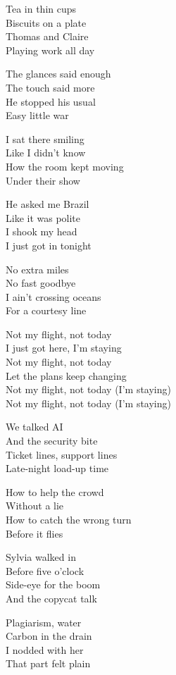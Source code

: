 \begin{lyrics}
Tea in thin cups\\
Biscuits on a plate\\
Thomas and Claire\\
Playing work all day

The glances said enough\\
The touch said more\\
He stopped his usual\\
Easy little war

I sat there smiling\\
Like I didn't know\\
How the room kept moving\\
Under their show

He asked me Brazil\\
Like it was polite\\
I shook my head\\
I just got in tonight

No extra miles\\
No fast goodbye\\
I ain't crossing oceans\\
For a courtesy line

Not my flight, not today\\
I just got here, I'm staying\\
Not my flight, not today\\
Let the plans keep changing\\
Not my flight, not today
(I'm staying)\\
Not my flight, not today
(I'm staying)

We talked AI\\
And the security bite\\
Ticket lines, support lines\\
Late-night load-up time

How to help the crowd\\
Without a lie\\
How to catch the wrong turn\\
Before it flies

Sylvia walked in\\
Before five o'clock\\
Side-eye for the boom\\
And the copycat talk

Plagiarism, water\\
Carbon in the drain\\
I nodded with her\\
That part felt plain


\end{lyrics}
